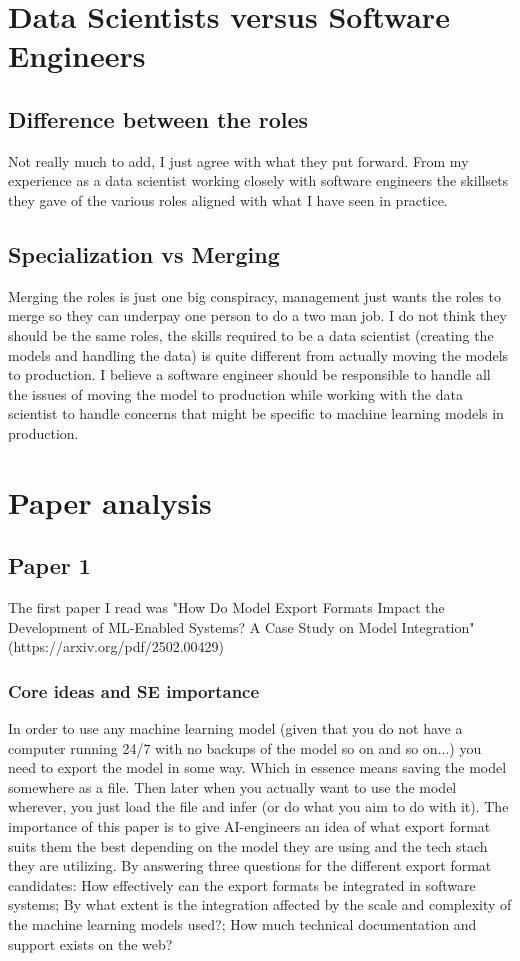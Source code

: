 \documentclass{article}
\begin{document}
\section{Data Scientists versus Software Engineers}
\subsection{Difference between the roles}
Not really much to add, I just agree with what they put forward. From my experience as a data scientist working closely with software engineers the skillsets they gave of the various roles aligned with what I have seen in practice.
\subsection{Specialization vs Merging}
Merging the roles is just one big conspiracy, management just wants the roles to merge so they can underpay one person to do a two man job. I do not think they should be the same roles, the skills required to be a data scientist (creating the models and handling the data) is quite different from actually moving the models to production. I believe a software engineer should be responsible to handle all the issues of moving the model to production while working with the data scientist to handle concerns that might be specific to machine learning models in production.


\section{Paper analysis}
\subsection{Paper 1}
The first paper I read was "How Do Model Export Formats Impact the Development of ML-Enabled Systems? A Case Study on Model Integration" (https://arxiv.org/pdf/2502.00429)
\subsubsection{Core ideas and SE importance}
In order to use any machine learning model (given that you do not have a computer running 24/7 with no backups of the model so on and so on...) you need to export the model in some way. Which in essence means saving the model somewhere as a file. Then later when you actually want to use the model wherever, you just load the file and infer (or do what you aim to do with it). The importance of this paper is to give AI-engineers an idea of what export format suits them the best depending on the model they are using and the tech stach they are utilizing. By answering three questions for the different export format candidates: How effectively can the export formats be integrated in software systems; By what extent is the integration affected by the scale and complexity of the machine learning models used?; How much technical documentation and support exists on the web?
\end{document}

